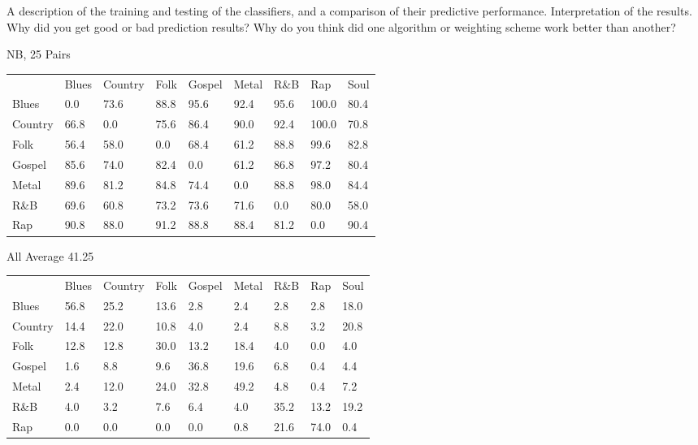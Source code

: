 \documentclass[a4paper,oneside]{article}
\begin{document}
A description of the training and testing of the classifiers, and a comparison of their predictive performance.
Interpretation of the results. Why did you get good or bad prediction results? Why do you think did one algorithm or weighting scheme work better than another?

NB, 25
Pairs
\begin{table}
\begin{tabular}{|l||*{8}{l|}} \hline
 & Blues & Country & Folk & Gospel & Metal & R\&B & Rap & Soul \\ \hhline{|=||*{8}{=|}}
Blues & 0.0 & 73.6 & 88.8 & 95.6 & 92.4 & 95.6 & 100.0 & 80.4 \\ \hline
Country & 66.8 & 0.0 & 75.6 & 86.4 & 90.0 & 92.4 & 100.0 & 70.8 \\ \hline
Folk & 56.4 & 58.0 & 0.0 & 68.4 & 61.2 & 88.8 & 99.6 & 82.8 \\ \hline
Gospel & 85.6 & 74.0 & 82.4 & 0.0 & 61.2 & 86.8 & 97.2 & 80.4 \\ \hline
Metal & 89.6 & 81.2 & 84.8 & 74.4 & 0.0 & 88.8 & 98.0 & 84.4 \\ \hline
R\&B & 69.6 & 60.8 & 73.2 & 73.6 & 71.6 & 0.0 & 80.0 & 58.0 \\ \hline
Rap & 90.8 & 88.0 & 91.2 & 88.8 & 88.4 & 81.2 & 0.0 & 90.4 \\ \hline
\end{tabular}
\end{table}

All
Average 41.25
\begin{table}
\begin{tabular}{|l||*{8}{l|}} \hline
&Blues & Country & Folk & Gospel & Metal & R\&B & Rap & Soul \\ \hhline{|=||*{8}{=|}}
Blues & 56.8 & 25.2 & 13.6 & 2.8 & 2.4 & 2.8 & 2.8 & 18.0 \\ \hline
Country & 14.4 & 22.0 & 10.8 & 4.0 & 2.4 & 8.8 & 3.2 & 20.8 \\ \hline
Folk & 12.8 & 12.8 & 30.0 & 13.2 & 18.4 & 4.0 & 0.0 & 4.0 \\ \hline
Gospel & 1.6 & 8.8 & 9.6 & 36.8 & 19.6 & 6.8 & 0.4 & 4.4 \\ \hline
Metal & 2.4 & 12.0 & 24.0 & 32.8 & 49.2 & 4.8 & 0.4 & 7.2 \\ \hline
R\&B & 4.0 & 3.2 & 7.6 & 6.4 & 4.0 & 35.2 & 13.2 & 19.2 \\ \hline
Rap & 0.0 & 0.0 & 0.0 & 0.0 & 0.8 & 21.6 & 74.0 & 0.4 \\ \hline
\end{tabular}
\end{table}
\end{document}
